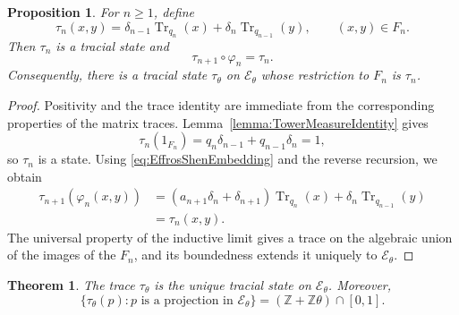 \documentclass{book}
\newtheorem{proposition}[definition]{Proposition}
\newtheorem{theorem}[definition]{Theorem}
\begin{document}
\begin{proposition}\label{proposition:EffrosShenTrace}
  For \(n\geq1\), define
  \[
    \tau_n(x,y)
      =\delta_{n-1}\operatorname{Tr}_{q_n}(x)
       +\delta_n\operatorname{Tr}_{q_{n-1}}(y),
    \qquad (x,y)\in F_n.
  \]
  Then \(\tau_n\) is a tracial state and
  \[
    \tau_{n+1}\circ\varphi_n=\tau_n.
  \]
  Consequently, there is a tracial state \(\tau_\theta\) on
  \(\mathcal E_\theta\) whose restriction to \(F_n\) is \(\tau_n\).
\end{proposition}

\begin{proof}
  Positivity and the trace identity are immediate from the corresponding
  properties of the matrix traces.  Lemma~\ref{lemma:TowerMeasureIdentity}
  gives
  \[
    \tau_n(1_{F_n})
      =q_n\delta_{n-1}+q_{n-1}\delta_n=1,
  \]
  so \(\tau_n\) is a state.  Using
  \eqref{eq:EffrosShenEmbedding} and the reverse recursion, we obtain
  \begin{align*}
    \tau_{n+1}(\varphi_n(x,y))
      &=(a_{n+1}\delta_n+\delta_{n+1})
          \operatorname{Tr}_{q_n}(x)
        +\delta_n\operatorname{Tr}_{q_{n-1}}(y)\\
      &=\tau_n(x,y).
  \end{align*}
  The universal property of the inductive limit gives a trace on the
  algebraic union of the images of the \(F_n\), and its boundedness extends
  it uniquely to \(\mathcal E_\theta\).
\end{proof}

\medskip

\begin{theorem}\label{theorem:EffrosShenUniqueTrace}
  The trace \(\tau_\theta\) is the unique tracial state on
  \(\mathcal E_\theta\).  Moreover,
  \[
    \{\tau_\theta(p):p\text{ is a projection in }\mathcal E_\theta\}
      =(\mathbb Z+\mathbb Z\theta)\cap[0,1].
  \]
\end{theorem}
\end{document}

